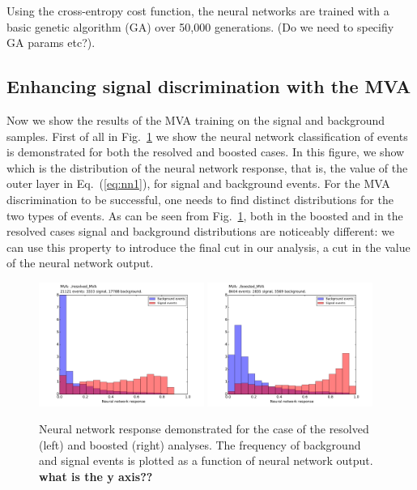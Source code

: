 Using the cross-entropy cost function, the neural networks are trained with a basic genetic algorithm (GA) over 50,000 generations.
(Do we need to specifiy GA params etc?).
\subsection{Enhancing signal discrimination with the MVA}

Now we show the results of the MVA training on the signal and
background samples.
%
First of all in Fig.~\ref{fig:nnresponse} we show
the neural network classification of events is demonstrated for both the resolved and boosted cases.
%
In this figure, we show which is the distribution of the neural network
response, that is, the value of the outer layer in Eq.~(\ref{eq:nn1}),
for signal and background events.
%
For the MVA discrimination to be successful, one needs to find
distinct distributions for the two types of events.
%
As can be seen from  Fig.~\ref{fig:nnresponse}, both
in the boosted and in the resolved cases signal and background
distributions are noticeably different: we can use this property
to introduce the final cut in our analysis, a cut in the value
of the neural network output.

\begin{figure}[t]
\begin{center}
\includegraphics[width=0.48\textwidth]{plots/resolved_MVA_hist.pdf}
\includegraphics[width=0.48\textwidth]{plots/boosted_MVA_hist.pdf}
\caption{\small Neural network response demonstrated for the case of the resolved (left) and boosted (right) analyses. The frequency of background and signal events is plotted as a function of neural network output.
{\bf what is the y axis??}
}
\label{fig:nnresponse}
\end{center}
\end{figure}

